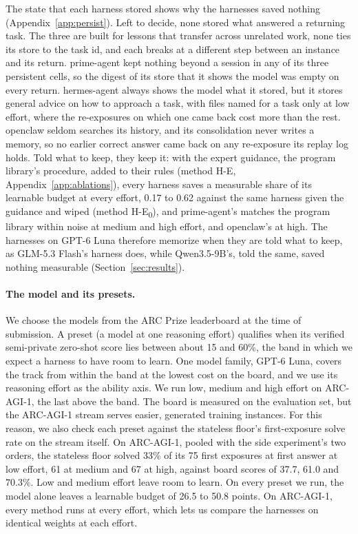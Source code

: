 The state that each harness stored shows why the harnesses saved nothing (Appendix~\ref{app:persist}). Left to decide, none stored what answered a returning task. The three are built for lessons that transfer across unrelated work, none ties its store to the task id, and each breaks at a different step between an instance and its return. prime-agent kept nothing beyond a session in any of its three persistent cells, so the digest of its store that it shows the model was empty on every return. hermes-agent always shows the model what it stored, but it stores general advice on how to approach a task, with files named for a task only at low effort, where the re-exposures on which one came back cost more than the rest. openclaw seldom searches its history, and its consolidation never writes a memory, so no earlier correct answer came back on any re-exposure its replay log holds. Told what to keep, they keep it: with the expert guidance, the program library's procedure, added to their rules (method \mbox{H-E}, Appendix~\ref{app:ablations}), every harness saves a measurable share of its learnable budget at every effort, 0.17 to 0.62 against the same harness given the guidance and wiped (method \mbox{H-E\textsubscript{0}}), and prime-agent's matches the program library within noise at medium and high effort, and openclaw's at high. The harnesses on GPT-6 Luna therefore memorize when they are told what to keep, as GLM-5.3 Flash's harness does, while Qwen3.5-9B's, told the same, saved nothing measurable (Section~\ref{sec:results}).

\paragraph{The model and its presets.}
\label{sec:models}
We choose the models from the ARC Prize leaderboard at the time of submission. A preset (a model at one reasoning effort) qualifies when its verified semi-private zero-shot score lies between about 15 and 60\%, the band in which we expect a harness to have room to learn. One model family, GPT-6 Luna, covers the track from within the band at the lowest cost on the board, and we use its reasoning effort as the ability axis. We run low, medium and high effort on ARC-AGI-1, the last above the band. The board is measured on the evaluation set, but the ARC-AGI-1 stream serves easier, generated training instances. For this reason, we also check each preset against the stateless floor's first-exposure solve rate on the stream itself. On ARC-AGI-1, pooled with the side experiment's two orders, the stateless floor solved 33\% of its 75 first exposures at first answer at low effort, 61 at medium and 67 at high, against board scores of 37.7, 61.0 and 70.3\%. Low and medium effort leave room to learn. On every preset we run, the model alone leaves a learnable budget of 26.5 to 50.8 points. On ARC-AGI-1, every method runs at every effort, which lets us compare the harnesses on identical weights at each effort.

